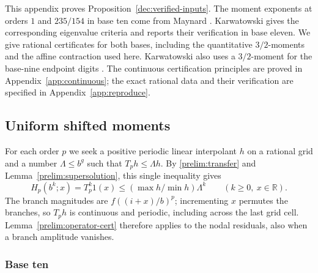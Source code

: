 \documentclass[11pt,a4paper]{article}
\theoremstyle{paperplain}
\numberwithin{equation}{section}
\begin{document}
This appendix proves Proposition~\ref{dec:verified-inputs}.
The moment exponents at orders $1$ and $235/154$ in base ten come
from Maynard \cite[Lemmas~10.3--10.4]{Maynard2019}. Karwatowski
\cite[\S\S3, 5, in particular Lemma~5.1]{Karwatowski2022} gives the corresponding
eigenvalue criteria and reports their verification in base eleven. We give rational certificates for both bases, including
the quantitative $3/2$-moments and the affine contraction used here.
Karwatowski also uses a $3/2$-moment for the base-nine endpoint digits
\cite[\S3, p.~5]{KarwatowskiBaseNine}. The continuous
certification principles are proved in Appendix~\ref{app:continuous};
the exact rational data and their verification are specified in
Appendix~\ref{app:reproduce}.

\subsection{Uniform shifted moments}

For each order $p$ we seek a positive periodic linear interpolant
$h$ on a rational grid and a number $\Lambda\le b^g$ such that
$T_ph\le\Lambda h$. By \eqref{prelim:transfer} and
Lemma~\ref{prelim:supersolution}, this single inequality gives
\begin{equation}\label{dec:transferiterate}
 H_p(b^k;x)=T_p^k1(x)\le(\max h/\min h)\Lambda^k
 \qquad(k\ge0,\ x\in\mathbb R).
\end{equation}
The branch magnitudes are $f((i+x)/b)^p$; incrementing $x$ permutes
the branches, so $T_ph$ is continuous and periodic, including across
the last grid cell. Lemma~\ref{prelim:operator-cert} therefore applies
to the nodal residuals, also when a branch amplitude vanishes.

\subsubsection{Base ten}
\end{document}
